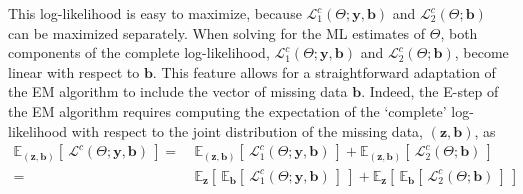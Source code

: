 \documentclass[11pt, a4paper]{article}
\begin{document}
This log-likelihood is easy to maximize, because $\mathcal{L}^c_1(\Theta; \mathbf{y}, \mathbf{b})$ and $\mathcal{L}^c_2(\Theta; \mathbf{b})$ can be maximized separately. When solving for the ML estimates of $\Theta$, both components of the complete log-likelihood, $\mathcal{L}^c_1(\Theta; \mathbf{y}, \mathbf{b})$ and $\mathcal{L}^c_2(\Theta; \mathbf{b})$, become linear with respect to $\mathbf{b}$. This feature allows for a straightforward adaptation of the EM algorithm to include the vector of missing data $\mathbf{b}$. Indeed, the E-step of the EM algorithm requires computing the expectation of the `complete' log-likelihood with respect to the joint distribution of the missing data, $(\mathbf{z},\mathbf{b})$, as %
\begin{align*}
\mathbb{E}_{(\mathbf{z},\mathbf{b})}\left[\!~ \mathcal{L}^c(\Theta; \mathbf{y},\mathbf{b}) \!~\right] = &~ \mathbb{E}_{(\mathbf{z},\mathbf{b})} \left[\!~ \mathcal{L}^c_1(\Theta; \mathbf{y},\mathbf{b}) \!~\right] + \mathbb{E}_{(\mathbf{z},\mathbf{b})} \left[\!~ \mathcal{L}^c_2(\Theta; \mathbf{b}) \!~\right] \\
= &~ \mathbb{E}_{\mathbf{z}} \left[\!~ \mathbb{E}_{\mathbf{b}} \left[\!~ \mathcal{L}^c_1(\Theta; \mathbf{y},\mathbf{b}) \!~\right] \!~\right] +  \mathbb{E}_{\mathbf{z}} \left[\!~ \mathbb{E}_{\mathbf{b}} \left[\!~ \mathcal{L}^c_2(\Theta; \mathbf{b}) \!~\right] \!~\right]
\end{align*}
\end{document}
